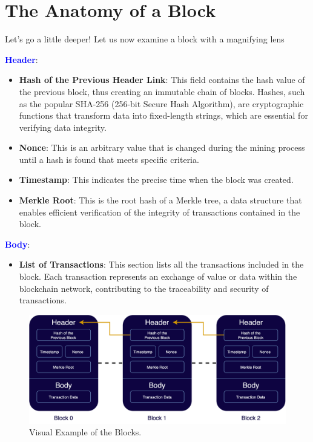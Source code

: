 \section{The Anatomy of a Block}

Let's go a little deeper! Let us now examine a block with a magnifying lens  \faSearch

\textbf{\textcolor{Blue}{Header}}:
\begin{itemize}
    \item \textbf{Hash of the Previous Header Link}: This field contains the hash value of the previous block, thus creating an immutable chain of blocks. Hashes, such as the popular SHA-256 (256-bit Secure Hash Algorithm), are cryptographic functions that transform data into fixed-length strings, which are essential for verifying data integrity.
    \item \textbf{Nonce}: This is an arbitrary value that is changed during the mining process until a hash is found that meets specific criteria.
    \item \textbf{Timestamp}: This indicates the precise time when the block was created.
    \item \textbf{Merkle Root}: This is the root hash of a Merkle tree, a data structure that enables efficient verification of the integrity of transactions contained in the block.
\end{itemize}


\textbf{\textcolor{Blue}{Body}}:
\begin{itemize}
    \item \textbf{List of Transactions}: This section lists all the transactions included in the block. Each transaction represents an exchange of value or data within the blockchain network, contributing to the traceability and security of transactions.
\end{itemize}

\vspace{1cm}
\begin{figure}[hb]
\centering\includegraphics[scale=0.16]{images/chapter2 - Blocks.png}
\caption{Visual Example of the Blocks.}
\end{figure}
